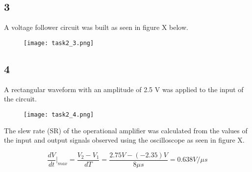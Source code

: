 \subsection*{3}

    A voltage follower circuit was built as seen in figure X below.\\
    
    \begin{figure}[h!]
        \centering
        \texttt{[image: task2\_3.png]}
    \end{figure}


\subsection*{4}

    A rectangular waveform with an amplitude of 2.5 V was applied to the input of the circuit.\\

    \begin{figure}[h!]
        \centering
        \texttt{[image: task2\_4.png]}
    \end{figure}

    The slew rate (SR) of the operational amplifier was calculated from the values of the input and output signals observed using the oscilloscope as seen in figure X.

    $$\dfrac{dV}{dt} \vert _{max} = \frac{V_2-V_1}{dT} = \frac{2.75V-(-2.35) V}{8\mu s} = 0.638 V/\mu s$$